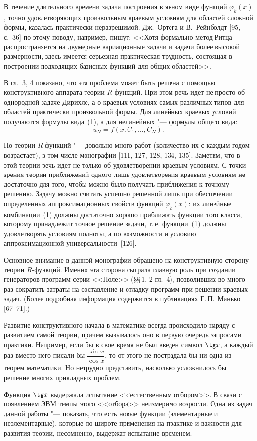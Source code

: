 В течение длительного времени задача построения в явном виде функций
$\varphi_k(x)$, точно удовлетворяющих произвольным краевым условиям для
областей сложной формы, казалась практически неразрешимой. Дж.~Ортега
и В.~Рейнболдт [95, с.~36] по этому поводу,
%
например, пишут: <<Хотя формально метод Ритца распространяется на
двумерные вариационные задачи и задачи более высокой размерности, здесь
имеется серьезная практическая трудность, состоящая в построении подходящих
базисных функций для общих областей>>.

В гл.~3, 4 показано, что эта проблема может быть решена с помощью
конструктивного аппарата теории $R$-функций. При этом речь идет не просто об
однородной задаче Дирихле, а о краевых условиях самых различных типов для
областей практически произвольной формы. Для линейных краевых условий
получаются формулы вида~(1), а для нелинейных "--- формулы общего вида:
\begin{equation}\tag{4}
u_N=f(x,C_1,\dots,C_N).
\end{equation}

По теории $R$-функций "--- довольно много работ (количество их с каждым
годом возрастает), в том числе монографии [111, 127, 128, 134, 135].
Заметим, что в этой теории речь идет не только об удовлетворении краевым
условиям. С точки зрения теории приближений одного лишь удовлетворения
краевым условиям не достаточно для того, чтобы можно было получать
приближения к точному решению. Задачу можно считать успешно решенной лишь
при обеспечении определенных аппроксимационных свойств функций
$\varphi_k(x)$: их линейные комбинации~(1) должны достаточно хорошо
приближать функции того класса, которому принадлежит точное решение задачи,
т.\,е. функции~(1) должны удовлетворять условиям полноты, а по возможности
и условию аппроксимационной универсальности~[126].

Основное внимание в данной монографии обращено на конструктивную сторону
теории $R$-функций. Именно эта сторона сыграла главную роль при создании
генераторов программ серии <<Поле>> (\S\S\,1, 2 гл.~4), позволивших во много
раз сократить затраты на составление и отладку программ при решении краевых
задач. (Более подробная информация содержится в публикациях Г.\,П.~Манько
[67--71].)

Развитие конструктивного начала в математике всегда происходило наряду
с развитием самой теории, причем вызывалось оно в первую очередь запросами
практики. Например, если бы в свое время не был введен символ $\tg x$,
а каждый раз вместо него писали бы $\dfrac{\sin x}{\cos x}$, то от этого не
пострадала бы ни одна из теорем математики. Но нетрудно представить,
насколько усложнилось бы решение многих прикладных проблем.

Функция $\tg x$ выдержала испытание <<естественным отбором>>. В связи
с появлением ЭВМ темпы этого <<отбора>> неизмеримо возросли. Одна из задач
данной работы "--- показать, что есть новые функции (элементарные
и неэлементарные), которые по широте применения на практике и важности для
развития теории, несомненно, выдержат испытание временем.
